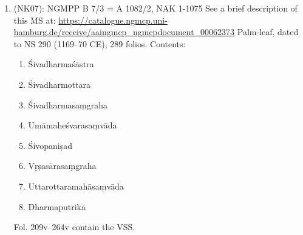 \documentclass[11pt]{article}
\begin{document}
\begin{enumerate}
      (going backwards) up to 1.62 (\emph{viṃśakoṭiṣu gulmeṣu ūrdhva°}).
Verses 1.62cd--2.22 seem to be missing.
The lower leaf on exp. 43 contains verses 2.23--2.39.
The single leaf in exp. 42 contains verses 2.40--3.16a.
Exp. 41 contains a single leaf of the \emph{Umāmaheśvarasaṃvāda},
      ending in a colophon for its chapter twenty-two,
      and still going backwards, the preceding folios continue transmitting the \emph{Umāmaheśvarasaṃvāda}.
Exploring the presence of the VSS in
      this manuscript further, one should look at the expositions after no. 44.
Exp. 45 contains the end of the \emph{Śivopaniṣad}.
The single leaf on exp. 46 is almost illegible but most probably contains
      a fragment of the \emph{Gautamadharmasūtra}. 
The second line just above the string hole on the left reads 
      \emph{\ldots{} vīrud vanaspatīnāṃ ca puṣpāṇi svavad ādadīte\ldots{}},
      which is a fragment of \emph{Gautamadharmasūtra} 2.3.25 (12.28).
The remaining parts of the VSS are to be found on exp. 47ff. 
The upper leaf on exp. 47 continues with VSS 3.16b-36ab,
      while the lower leaf contains a text that I have not been able to identify.
The lower leaf in exp. 48 transmits 3.36cd--4.11ab, the upper one 4.11b--30a.
The lower leaf in exp. 49 contains 4.30ab--47ab, the upper one 47d--68a.
And so on so forth.
Thus when reading the text from these images, after exp. 48,
      one has to start with the lower leaf and continue with the upper one.

\item \msNc (NK07): NGMPP B 7/3 = A 1082/2, NAK 1-1075
\label{sec:org50cb4b4}
See a brief description of this MS at:
  \url{https://catalogue.ngmcp.uni-hamburg.de/receive/aaingmcp\_ngmcpdocument\_00062373}
Palm-leaf, dated to NS 290 (1169--70 CE), 289 folios.
Contents:
\begin{enumerate}
\item Śivadharmaśāstra
\item Śivadharmottara
\item Śivadharmasaṃgraha
\item Umāmaheśvarasaṃvāda
\item Śivopaniṣad
\item Vṛṣasārasaṃgraha
\item Uttarottaramahāsaṃvāda
\item Dharmaputrikā
\end{enumerate}
Fol. 209v--264v contain the VSS.


\end{enumerate}
\end{document}
